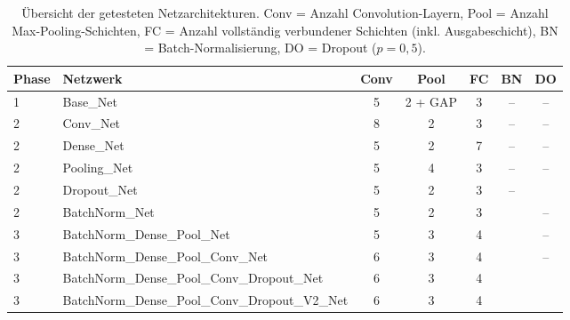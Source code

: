 \begin{table}[H]
	\centering
	\caption{Übersicht der getesteten Netzarchitekturen. Conv = Anzahl Convolution-Layern, Pool = Anzahl Max-Pooling-Schichten, FC = Anzahl vollständig verbundener Schichten (inkl. Ausgabeschicht), BN = Batch-Normalisierung, DO = Dropout ($p = 0{,}5$).}
	\label{tab:architektur_uebersicht}
	\begin{tabular}{llccccc}
		\toprule
		\textbf{Phase} & \textbf{Netzwerk}                              & \textbf{Conv} & \textbf{Pool} & \textbf{FC} & \textbf{BN} & \textbf{DO} \\
		\midrule
		1              & Base\_Net                                      & 5             & 2 + GAP       & 3           & --          & --          \\
		\midrule
		2              & Conv\_Net                                      & 8             & 2             & 3           & --          & --          \\
		2              & Dense\_Net                                     & 5             & 2             & 7           & --          & --          \\
		2              & Pooling\_Net                                   & 5             & 4             & 3           & --          & --          \\
		2              & Dropout\_Net                                   & 5             & 2             & 3           & --          & \checkmark  \\
		2              & BatchNorm\_Net                                 & 5             & 2             & 3           & \checkmark  & --          \\
		\midrule
		3              & BatchNorm\_Dense\_Pool\_Net                    & 5             & 3             & 4           & \checkmark  & --          \\
		3              & BatchNorm\_Dense\_Pool\_Conv\_Net              & 6             & 3             & 4           & \checkmark  & --          \\
		3              & BatchNorm\_Dense\_Pool\_Conv\_Dropout\_Net     & 6             & 3             & 4           & \checkmark  & \checkmark  \\
		3              & BatchNorm\_Dense\_Pool\_Conv\_Dropout\_V2\_Net & 6             & 3             & 4           & \checkmark  & \checkmark  \\
		\bottomrule
	\end{tabular}
\end{table}
 
